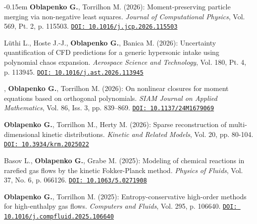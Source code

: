 
\begin{enumerate}
\itemsep-0.15em 
      \journalitemprsc \textbf{Oblapenko G.}, {Torrilhon M.} (2026): Moment-preserving particle merging via non-negative least squares. \textit{Journal of Computational Physics}, Vol. 569, Pt. 2, p. 115503. \newline
      \href{https://doi.org/10.1016/j.jcp.2026.115503}{\texttt{DOI: 10.1016/j.jcp.2026.115503}}

      \journalitemprsc Lüthi L., Hoste J.-J., \textbf{Oblapenko G.}, Banica M. (2026): Uncertainty quantification of CFD predictions for a generic hypersonic intake using polynomial chaos expansion. \textit{Aerospace Science and Technology}, Vol. 180, Pt. 4, p. 113945. \newline
      \href{https://doi.org/10.1016/j.ast.2026.113945}{\texttt{DOI: 10.1016/j.ast.2026.113945}}

      , \textbf{Oblapenko G.}, {Torrilhon M.} (2026): On nonlinear closures for moment equations based on orthogonal polynomials. \textit{SIAM Journal on Applied Mathematics}, Vol. 86, Iss. 3, pp. 839--869. \newline
      \href{https://doi.org/10.1137/24M1679069}{\texttt{DOI: 10.1137/24M1679069}}
    
    \journalitemprsc \textbf{Oblapenko G.}, Torrilhon M., Herty M. (2026): Sparse reconstruction of multi-dimensional kinetic distributions. \textit{Kinetic and Related Models}, Vol. 20, pp. 80-104. \newline
    \href{https://doi.org/10.3934/krm.2025022}{\texttt{DOI: 10.3934/krm.2025022}}
    
    \journalitemprsc Basov L., \textbf{Oblapenko G.}, Grabe M. (2025): Modeling of chemical reactions in rarefied gas flows by the kinetic Fokker-Planck method. \textit{Physics of Fluids}, Vol. 37, No. 6, p. 066126. \newline
    \href{https://doi.org/10.1063/5.0271908}{\texttt{DOI: 10.1063/5.0271908}}

\journalitemprsc \textbf{Oblapenko G.}, Torrilhon M. (2025): {Entropy-conservative high-order methods for high-enthalpy gas flows}. \textit{Computers and Fluids}, Vol. 295, p. 106640.\newline
    \href{https://doi.org/10.1016/j.compfluid.2025.106640}{\texttt{DOI: 10.1016/j.compfluid.2025.106640}}


\end{enumerate}
